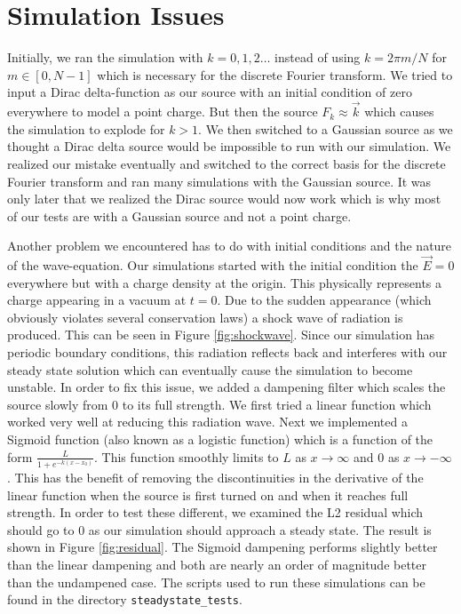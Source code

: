 \documentclass{article}
\begin{document}
	\section{Simulation Issues}
	
	Initially, we ran the simulation with $k=0,1,2\dots$ instead of using $k=2\pi m/N$ for $m \in [0,N-1]$ which is necessary for the discrete Fourier transform. We tried to input a Dirac delta-function as our source with an initial condition of zero everywhere to model a point charge. But then the source $F_k \approx \vec{k}$ which causes the simulation to explode for $k>1$. We then switched to a Gaussian source as we thought a Dirac delta source would be impossible to run with our simulation. We realized our mistake eventually and switched to the correct basis for the discrete Fourier transform and ran many simulations with the Gaussian source. It was only later that we realized the Dirac source would now work which is why most of our tests are with a Gaussian source and not a point charge.
	
	Another problem we encountered has to do with initial conditions and the nature of the wave-equation. Our simulations started with the initial condition the $\vec E=0$ everywhere but with a charge density at the origin. This physically represents a charge appearing in a vacuum at $t=0$. Due to the sudden appearance (which obviously violates several conservation laws) a shock wave of radiation is produced. This can be seen in Figure \ref{fig:shockwave}. Since our simulation has periodic boundary conditions, this radiation reflects back and interferes with our steady state solution which can eventually cause the simulation to become unstable. In order to fix this issue, we added a dampening filter which scales the source slowly from 0 to its full strength. We first tried a linear function which worked very well at reducing this radiation wave. Next we implemented a Sigmoid function (also known as a logistic function) which is a function of the form $\frac{L}{1+e^{-k(x-x_0)}}$. This function smoothly limits to $L$ as $x\to\infty$ and $0$ as $x\to-\infty$. This has the benefit of removing the discontinuities in the derivative of the linear function when the source is first turned on and when it reaches full strength. In order to test these different, we examined the L2 residual which should go to 0 as our simulation should approach a steady state. The result is shown in Figure \ref{fig:residual}. The Sigmoid dampening performs slightly better than the linear dampening and both are nearly an order of magnitude better than the undampened case. The scripts used to run these simulations can be found in the directory \verb|steadystate_tests|.
	
\end{document}
